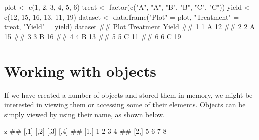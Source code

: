 \documentclass[a4paper,12pt,oneside]{book}
\newenvironment{Shaded}{\begin{snugshade}}{\end{snugshade}}
\newcommand{\DecValTok}[1]{#1}
\newcommand{\StringTok}[1]{#1}
\newcommand{\DocumentationTok}[1]{#1}
\newcommand{\OtherTok}[1]{#1}
\newcommand{\FunctionTok}[1]{#1}
\newcommand{\NormalTok}[1]{#1}
\begin{document}
\scriptsize

\begin{Shaded}
\begin{Highlighting}[]
\NormalTok{plot  }\OtherTok{\textless{}{-}}  \FunctionTok{c}\NormalTok{(}\DecValTok{1}\NormalTok{, }\DecValTok{2}\NormalTok{, }\DecValTok{3}\NormalTok{, }\DecValTok{4}\NormalTok{, }\DecValTok{5}\NormalTok{, }\DecValTok{6}\NormalTok{)}
\NormalTok{treat  }\OtherTok{\textless{}{-}}  \FunctionTok{factor}\NormalTok{(}\FunctionTok{c}\NormalTok{(}\StringTok{"A"}\NormalTok{, }\StringTok{"A"}\NormalTok{, }\StringTok{"B"}\NormalTok{, }\StringTok{"B"}\NormalTok{, }\StringTok{"C"}\NormalTok{, }\StringTok{"C"}\NormalTok{))}
\NormalTok{yield  }\OtherTok{\textless{}{-}}  \FunctionTok{c}\NormalTok{(}\DecValTok{12}\NormalTok{, }\DecValTok{15}\NormalTok{, }\DecValTok{16}\NormalTok{, }\DecValTok{13}\NormalTok{, }\DecValTok{11}\NormalTok{, }\DecValTok{19}\NormalTok{)}
\NormalTok{dataset  }\OtherTok{\textless{}{-}}  \FunctionTok{data.frame}\NormalTok{(}\StringTok{"Plot"} \OtherTok{=}\NormalTok{ plot,}
  \StringTok{"Treatment"} \OtherTok{=}\NormalTok{ treat, }\StringTok{"Yield"} \OtherTok{=}\NormalTok{ yield)}
\NormalTok{dataset}
\DocumentationTok{\#\#   Plot Treatment Yield}
\DocumentationTok{\#\# 1    1         A    12}
\DocumentationTok{\#\# 2    2         A    15}
\DocumentationTok{\#\# 3    3         B    16}
\DocumentationTok{\#\# 4    4         B    13}
\DocumentationTok{\#\# 5    5         C    11}
\DocumentationTok{\#\# 6    6         C    19}
\end{Highlighting}
\end{Shaded}

\normalsize

\hypertarget{working-with-objects}{%
\section{Working with objects}\label{working-with-objects}}

If we have created a number of objects and stored them in memory, we might be interested in viewing them or accessing some of their elements. Objects can be simply viewed by using their name, as shown below.

\begin{Shaded}
\begin{Highlighting}[]
\NormalTok{z}
\DocumentationTok{\#\#      [,1] [,2] [,3] [,4]}
\DocumentationTok{\#\# [1,]    1    2    3    4}
\DocumentationTok{\#\# [2,]    5    6    7    8}
\end{Highlighting}
\end{Shaded}
\end{document}
